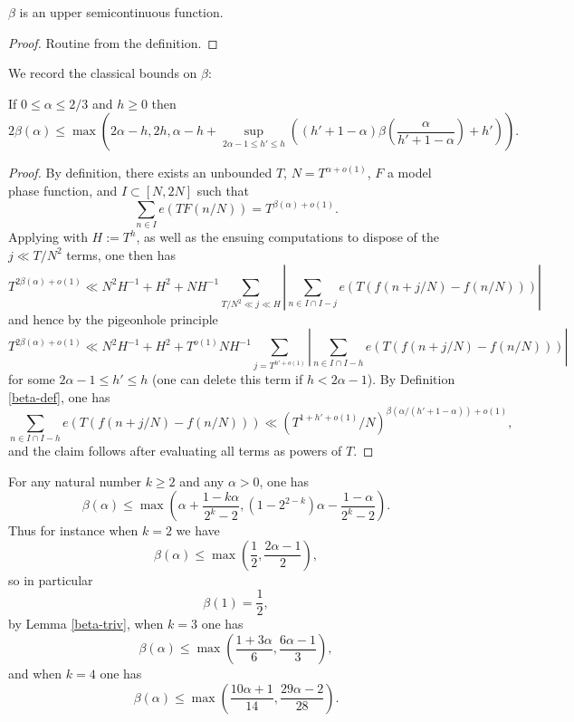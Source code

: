 \begin{lemma}\label{beta-semicts} $\beta$ is an upper semicontinuous function.
\end{lemma}

\begin{proof} Routine from the definition.
\end{proof}

We record the classical bounds on $\beta$:

\begin{lemma}\label{vdca-beta} If $0 \leq \alpha \leq 2/3$ and $h \geq 0$ then
$$ 2\beta(\alpha) \leq \max( 2\alpha - h, 2h, \alpha - h + \sup_{2\alpha-1 \leq h' \leq h} ((h'+1-\alpha)\beta(\frac{\alpha}{h'+1-\alpha})+h')).$$
\end{lemma}

\begin{proof}  By definition, there exists an unbounded $T$, $N = T^{\alpha+o(1)}$, $F$ a model phase function, and $I \subset [N,2N]$ such that
    $$ \sum_{n \in I} e(T F(n/N)) = T^{\beta(\alpha)+o(1)}.$$
Applying \cite[(2.54)]{ivic} with $H := T^h$, as well as the ensuing computations to dispose of the $j \ll T/N^2$ terms, one then has
$$ T^{2\beta(\alpha)+o(1)} \ll N^2 H^{-1} + H^2 + N H^{-1} \sum_{T/N^2 \ll j \ll H} |\sum_{n \in I \cap I-j} e(T (f(n+j/N) - f(n/N)))|$$
and hence by the pigeonhole principle
$$ T^{2\beta(\alpha)+o(1)} \ll N^2 H^{-1} + H^2 + T^{o(1)} N H^{-1} \sum_{j = T^{h'+o(1)}} |\sum_{n \in I \cap I-h} e(T (f(n+j/N) - f(n/N)))|$$
for some $2\alpha-1 \leq h' \leq h$ (one can delete this term if $h < 2\alpha-1$).  By Definition \ref{beta-def}, one has
$$ \sum_{n \in I \cap I-h} e(T (f(n+j/N) - f(n/N))) \ll (T^{1+h'+o(1)}/N)^{\beta(\alpha/(h'+1-\alpha))+o(1)},$$
and the claim follows after evaluating all terms as powers of $T$.
\end{proof}


\begin{proposition}\label{beta-vdc} For any natural number $k \geq 2$ and any $\alpha>0$, one has
    $$ \beta(\alpha) \leq \max\left( \alpha + \frac{1-k\alpha}{2^k-2}, (1 - 2^{2-k})\alpha - \frac{1-\alpha}{2^k-2}\right).$$
    Thus for instance when $k=2$ we have
    $$ \beta(\alpha) \leq \max\left( \frac{1}{2}, \frac{2\alpha-1}{2} \right),$$
    so in particular
    \begin{equation}\label{beta-1}
        \beta(1)= \frac{1}{2},
    \end{equation}
        by Lemma \ref{beta-triv},
    when $k=3$ one has
    $$ \beta(\alpha) \leq \max\left( \frac{1+3\alpha}{6}, \frac{6\alpha-1}{3} \right),$$
    and when $k=4$ one has
    $$ \beta(\alpha) \leq \max\left( \frac{10\alpha+1}{14}, \frac{29\alpha-2}{28} \right).$$
\end{proposition}

